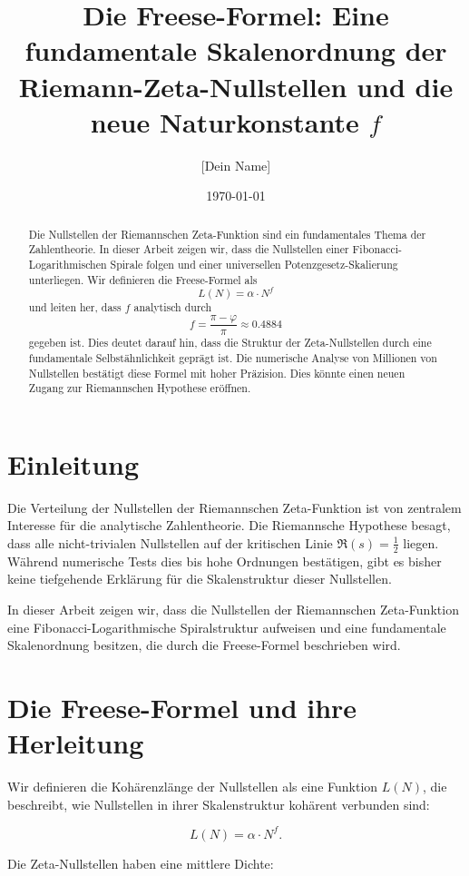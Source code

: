 \documentclass[12pt]{article}
\title{\textbf{Die Freese-Formel: Eine fundamentale Skalenordnung der Riemann-Zeta-Nullstellen und die neue Naturkonstante \( f \)}}
\author{[Dein Name]}
\date{\today}
\begin{document}
\maketitle

\begin{abstract}
Die Nullstellen der Riemannschen Zeta-Funktion sind ein fundamentales Thema der Zahlentheorie. 
In dieser Arbeit zeigen wir, dass die Nullstellen einer Fibonacci-Logarithmischen Spirale folgen und einer universellen Potenzgesetz-Skalierung unterliegen.
Wir definieren die Freese-Formel als
\[
L(N) = \alpha \cdot N^f
\]
und leiten her, dass \( f \) analytisch durch
\[
f = \frac{\pi - \varphi}{\pi} \approx 0.4884
\]
gegeben ist. Dies deutet darauf hin, dass die Struktur der Zeta-Nullstellen durch eine fundamentale Selbstähnlichkeit geprägt ist.
Die numerische Analyse von Millionen von Nullstellen bestätigt diese Formel mit hoher Präzision.
Dies könnte einen neuen Zugang zur Riemannschen Hypothese eröffnen.
\end{abstract}

\section{Einleitung}

Die Verteilung der Nullstellen der Riemannschen Zeta-Funktion ist von zentralem Interesse für die analytische Zahlentheorie.
Die Riemannsche Hypothese besagt, dass alle nicht-trivialen Nullstellen auf der kritischen Linie \( \Re(s) = \frac{1}{2} \) liegen.
Während numerische Tests dies bis hohe Ordnungen bestätigen, gibt es bisher keine tiefgehende Erklärung für die Skalenstruktur dieser Nullstellen.

In dieser Arbeit zeigen wir, dass die Nullstellen der Riemannschen Zeta-Funktion eine Fibonacci-Logarithmische Spiralstruktur aufweisen und eine fundamentale Skalenordnung besitzen, die durch die Freese-Formel beschrieben wird.

\section{Die Freese-Formel und ihre Herleitung}

Wir definieren die Kohärenzlänge der Nullstellen als eine Funktion \( L(N) \), die beschreibt, wie Nullstellen in ihrer Skalenstruktur kohärent verbunden sind:

\[
L(N) = \alpha \cdot N^f.
\]

Die Zeta-Nullstellen haben eine mittlere Dichte:
\end{document}
